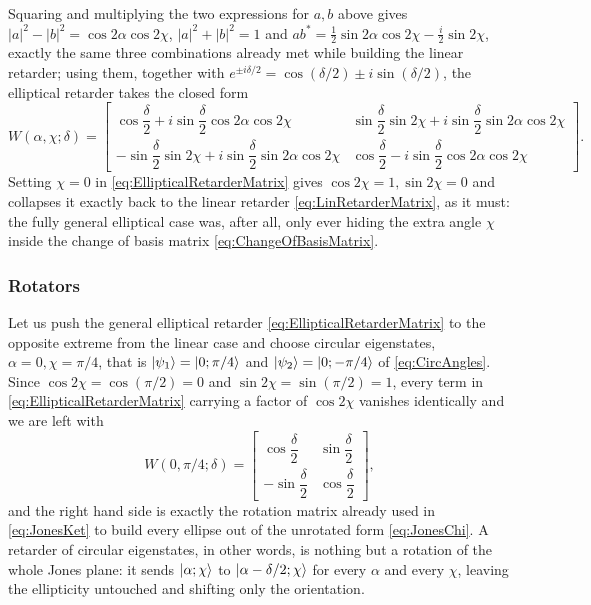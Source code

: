             Squaring and multiplying the two expressions for $a,b$ above gives $|a|^2-|b|^2=\cos2\alpha\cos2\chi$, $|a|^2+|b|^2=1$ and $ab^*=\frac12\sin2\alpha\cos2\chi-\frac{i}{2}\sin2\chi$, exactly the same three combinations already met while building the linear retarder; using them, together with $e^{\pm i\delta/2}=\cos(\delta/2)\pm i\sin(\delta/2)$, the elliptical retarder takes the closed form
            \begin{equation}\label{eq:EllipticalRetarderMatrix}
                W(\alpha,\chi;\delta) = \begin{bmatrix}
                    \cos\dfrac\delta2+i\sin\dfrac\delta2\cos2\alpha\cos2\chi & \sin\dfrac\delta2\sin2\chi+i\sin\dfrac\delta2\sin2\alpha\cos2\chi \\[8pt]
                    -\sin\dfrac\delta2\sin2\chi+i\sin\dfrac\delta2\sin2\alpha\cos2\chi & \cos\dfrac\delta2-i\sin\dfrac\delta2\cos2\alpha\cos2\chi
                \end{bmatrix}.
            \end{equation}
            Setting $\chi=0$ in \ref{eq:EllipticalRetarderMatrix} gives $\cos2\chi=1,\sin2\chi=0$ and collapses it exactly back to the linear retarder \ref{eq:LinRetarderMatrix}, as it must: the fully general elliptical case was, after all, only ever hiding the extra angle $\chi$ inside the change of basis matrix \ref{eq:ChangeOfBasisMatrix}.



        \subsubsection{Rotators}

            Let us push the general elliptical retarder \ref{eq:EllipticalRetarderMatrix} to the opposite extreme from the linear case and choose circular eigenstates, $\alpha=0,\chi=\pi/4$, that is $\ket{\psi_1}=\ket{0;\pi/4}$ and $\ket{\psi_2}=\ket{0;-\pi/4}$ of \ref{eq:CircAngles}. Since $\cos2\chi=\cos(\pi/2)=0$ and $\sin2\chi=\sin(\pi/2)=1$, every term in \ref{eq:EllipticalRetarderMatrix} carrying a factor of $\cos2\chi$ vanishes identically and we are left with
            \begin{equation}\label{eq:RotatorFromRetarder}
                W(0,\pi/4;\delta) = \begin{bmatrix}\cos\dfrac{\delta}{2} & \sin\dfrac{\delta}{2}\\[6pt] -\sin\dfrac{\delta}{2} & \cos\dfrac{\delta}{2}\end{bmatrix},
            \end{equation}
            and the right hand side is exactly the rotation matrix already used in \ref{eq:JonesKet} to build every ellipse out of the unrotated form \ref{eq:JonesChi}. A retarder of circular eigenstates, in other words, is nothing but a rotation of the whole Jones plane: it sends $\ket{\alpha;\chi}$ to $\ket{\alpha-\delta/2;\chi}$ for every $\alpha$ and every $\chi$, leaving the ellipticity untouched and shifting only the orientation.

